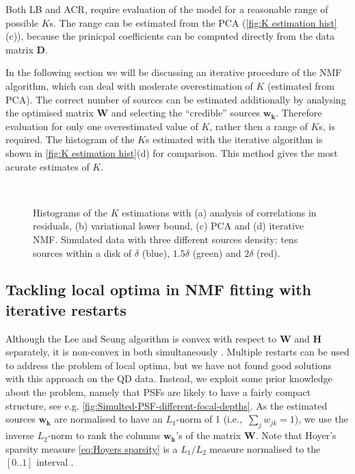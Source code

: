 Both LB and ACR, require evaluation of the model for a reasonable range of possible $K$s. The range can be estimated from the PCA  (\autoref{fig:K estimation hist}(c)), because the prinicpal coefficients can be computed directly from the data matrix $\bm{D}$.

In the following section we will be discussing an iterative procedure of the NMF algorithm, which can deal with moderate overestimation of $K$  (estimated from PCA). The correct number of sources can be estimated additionally by analysing the optimised matrix $\bm{W}$ and selecting the ``credible'' sources $\bm{w_{k}}$. Therefore evaluation for only one overestimated value of $K$, rather then a range of $K$s, is required. The histogram of the $K$s estimated with the iterative algorithm is shown in  \autoref{fig:K estimation hist}(d) for comparison. This method gives the most acurate estimates of $K$. 
%
\begin{figure}[!hbt]
	\newcommand{\sizef}{.4}		
	\centering
	\\
	\caption{Histograms of the $K$ estimations with (a) analysis of correlations in residuals, (b) variational lower bound, (c) PCA and (d) iterative NMF. Simulated data with three different sources density: tens sources within a disk of $\delta$ (blue), $1.5\delta$ (green) and $2\delta$ (red).}
	\label{fig:K estimation hist}
\end{figure}

\clearpage
\subsection{Tackling local optima in NMF fitting with iterative restarts \label{sub: Iterative restarts}}

Although the Lee and Seung algorithm is convex with respect to $\bm{W}$ and $\bm{H}$ separately, it is non-convex in both simultaneously \cite{Lee2001}. Multiple restarts can be used to address the problem of local optima, but we have not found good solutions with this approach on the QD data. Instead, we exploit some prior knowledge about the problem, namely that PSFs are likely to have a fairly compact structure, see e.g. \autoref{fig:Simulted-PSF-different-focal-depths}. As the estimated sources $\bm{w_{k}}$ are normalised to have an $L_1$-norm of 1 (i.e.,\ $\sum_{j}w_{jk}=1$), we use the inverse $L_2$-norm to rank the columns $\bm{w_{k}}$'s of the matrix $\bm{W}$. Note that Hoyer's sparsity measure \autoref{eq:Hoyers sparsity} is a $L_{1}/L_{2}$ measure normalised to the $[0..1]$ interval \cite{Kim2008}. 


